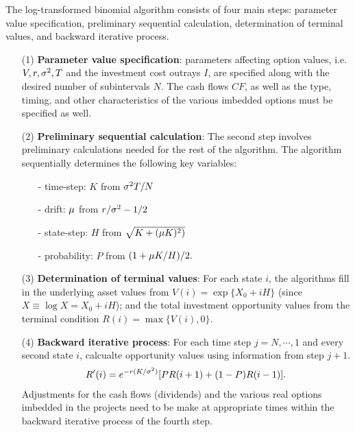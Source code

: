 \documentclass[11pt,letter]{article}
\theoremstyle{definition}
\theoremstyle{remark}
\numberwithin{equation}{section}
\begin{document}
The log-transformed binomial algorithm consists of four main steps: parameter value specification, preliminary sequential calculation, determination of terminal values, and backward iterative process.

\begin{itemize}
    \item[(1)] \textbf{Parameter value specification}: parameters affecting option values, i.e. $V,r,\sigma^2,T$ and the investment cost outrays $I$, are specified along with the desired number of subintervals $N$. The cash flows $CF$, as well as the type, timing, and other characteristics of the various imbedded options must be specified as well.
    
    \item[(2)] \textbf{Preliminary sequential calculation}: The second step involves preliminary calculations needed for the rest of the algorithm. The algorithm sequentially determines the following key variables:
    \begin{itemize}
        \item[-] time-step: $K$ from $\sigma^2T/N$
        \item[-] drift: $\mu$ from $r/\sigma^2-1/2$
        \item[-] state-step: $H$ from $\sqrt{K+(\mu K)^2)}$
        \item[-] probability: $P$ from $(1+\mu K/H)/2.$
    \end{itemize}
    
    \item[(3)] \textbf{Determination of terminal values}: For each state $i$, the algorithms fill in the underlying asset values from $V(i)=\exp\{X_0+iH\}$ (since $X\equiv\log X=X_0+iH$); and the total investment opportunity values from the terminal condition $R(i)=\max\{V(i),0\}$.
    
    \item[(4)] \textbf{Backward iterative process}: For each time step $j=N,\cdots,1$ and every second state $i$, calcualte opportunity values using information from step $j+1$.
    \begin{align*}
        R'(i)=e^{-r(K/\sigma^2)}[PR(i+1)+(1-P)R(i-1)].
    \end{align*}
    Adjustments for the cash flows (dividends) and the various real options imbedded in the projects need to be make at appropriate times within the backward iterative process of the fourth step.
\end{itemize}
\end{document}
